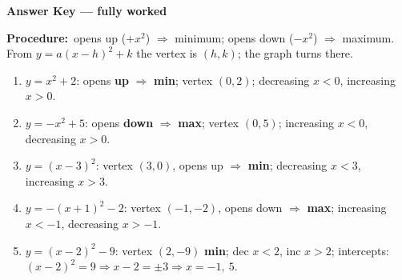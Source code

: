 \documentclass[12pt]{article}
\begin{document}
\newpage
\begin{center}{\Large\textbf{Answer Key --- fully worked}}\end{center}
\vspace{0.15cm}
\textbf{Procedure:}\ opens up ($+x^2$) $\Rightarrow$ minimum; opens down ($-x^2$) $\Rightarrow$ maximum. From $y=a(x-h)^2+k$ the vertex is $(h,k)$; the graph turns there.\\[8pt]
\begin{enumerate}[label=\textbf{\arabic*.},itemsep=8pt]
\item $y=x^{2}+2$: opens \textbf{up} $\Rightarrow$ \textbf{min}; vertex $(0,2)$; decreasing $x<0$, increasing $x>0$.
\item $y=-x^{2}+5$: opens \textbf{down} $\Rightarrow$ \textbf{max}; vertex $(0,5)$; increasing $x<0$, decreasing $x>0$.
\item $y=(x-3)^{2}$: vertex $(3,0)$, opens up $\Rightarrow$ \textbf{min}; decreasing $x<3$, increasing $x>3$.
\item $y=-(x+1)^{2}-2$: vertex $(-1,-2)$, opens down $\Rightarrow$ \textbf{max}; increasing $x<-1$, decreasing $x>-1$.
\item $y=(x-2)^{2}-9$: vertex $(2,-9)$ \textbf{min}; dec $x<2$, inc $x>2$; intercepts: $(x-2)^2=9\Rightarrow x-2=\pm3\Rightarrow x=-1,\ 5$.
\end{enumerate}
\end{document}
